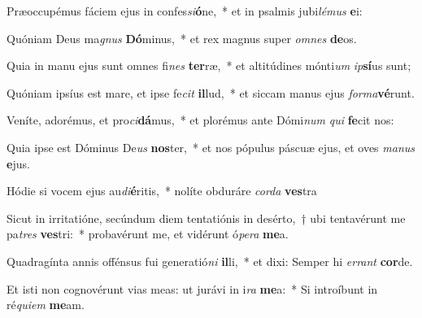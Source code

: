 \item Præoccupémus fáciem ejus in confes\textit{si}\textbf{ó}ne,~* et in psalmis jubi\textit{lé}\textit{mus} \textbf{e}i:
\item Quóniam Deus ma\textit{gnus} \textbf{Dó}minus,~* et rex magnus super \textit{om}\textit{nes} \textbf{de}os.
\item Quia in manu ejus sunt omnes fi\textit{nes} \textbf{ter}ræ,~* et altitúdines mónti\textit{um} \textit{ip}\textbf{sí}us sunt;
\item Quóniam ipsíus est mare, et ipse fe\textit{cit} \textbf{il}lud,~* et siccam manus ejus \textit{for}\textit{ma}\textbf{vé}runt.
\item Veníte, adorémus, et pro\textit{ci}\textbf{dá}mus,~* et plorémus ante Dómi\textit{num} \textit{qui} \textbf{fe}cit nos:
\item Quia ipse est Dóminus De\textit{us} \textbf{nos}ter,~* et nos pópulus páscuæ ejus, et oves \textit{ma}\textit{nus} \textbf{e}jus.
\item Hódie si vocem ejus au\textit{di}\textbf{é}ritis,~* nolíte obduráre \textit{cor}\textit{da} \textbf{ves}tra
\item Sicut in irritatióne, secúndum diem tentatiónis in desérto,~† ubi tentavérunt me pa\textit{tres} \textbf{ves}tri:~* probavérunt me, et vidérunt ó\textit{pe}\textit{ra} \textbf{me}a.
\item Quadragínta annis offénsus fui generatió\textit{ni} \textbf{il}li,~* et dixi: Semper hi \textit{er}\textit{rant} \textbf{cor}de.
\item Et isti non cognovérunt vias meas: ut jurávi in i\textit{ra} \textbf{me}a:~* Si introíbunt in ré\textit{qui}\textit{em} \textbf{me}am.
